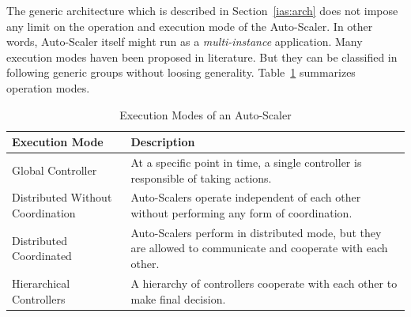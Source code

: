 The generic architecture which is described in Section~\ref{ias:arch} does not impose any limit on the operation and execution mode of the Auto-Scaler. In other words, Auto-Scaler itself might run as a \emph{multi-instance} application. Many execution modes haven been proposed in literature. But they can be classified in following generic groups without loosing generality. Table~\ref{tab:exec-mode} summarizes operation modes. 
\begin{table}[h]
    \begin{tabularx}{\textwidth}{lX}
        \toprule
        \textbf{Execution Mode} & \textbf{Description}\\
        \midrule
        Global Controller & At a specific point in time, a single controller is responsible of taking actions.\\
        Distributed Without Coordination & Auto-Scalers operate independent of each other without performing any form of coordination.\\
        Distributed Coordinated & Auto-Scalers perform in distributed mode, but they are allowed to communicate and cooperate with each other.\\
        Hierarchical Controllers & A hierarchy of controllers cooperate with each other to make final decision.\\
        \bottomrule
    \end{tabularx}
    \centering
    \caption{Execution Modes of an Auto-Scaler}
    \label{tab:exec-mode}
\end{table}
\clearpage
